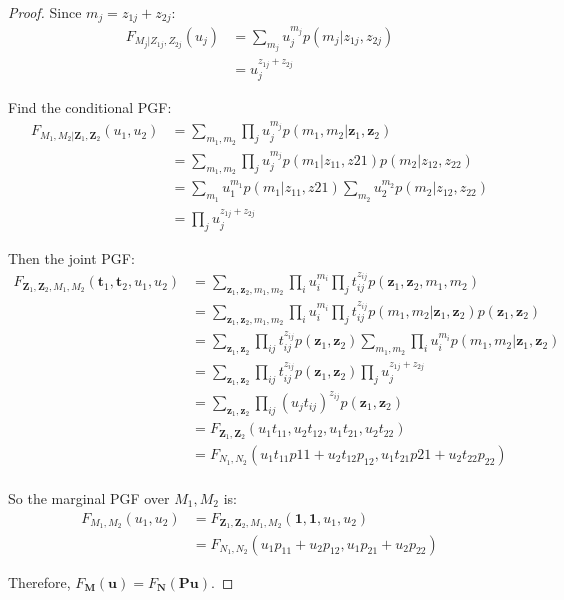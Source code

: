 \documentclass{article}
\begin{document}
\begin{proof}
Since $m_j = z_{1j} + z_{2j}$:
\begin{align*}
F_{M_j|Z_{1j}, Z_{2j}}(u_j) &= \sum_{m_j} u_j^{m_j} p(m_j|z_{1j}, z_{2j}) \\
&= u_j^{z_{1j} + z_{2j}}
\end{align*}

Find the conditional PGF:
\begin{align*}
F_{M_1, M_2 | \mathbf{Z}_1, \mathbf{Z}_2}(u_1, u_2)
&= \sum_{m_1, m_2} \prod_{j} u_{j}^{m_{j}} p(m_1, m_2|\mathbf{z}_1, \mathbf{z}_2) \\
&= \sum_{m_1, m_2} \prod_{j} u_{j}^{m_{j}} p(m_1|z_{11}, z{21}) p(m_2|z_{12}, z_{22}) \\
&= \sum_{m_1} u_1^{m_1} p(m_1|z_{11}, z{21}) \sum_{m_2} u_2^{m_2} p(m_2|z_{12}, z_{22}) \\
&= \prod_j u_j^{z_{1j} + z_{2j}}
\end{align*}

Then the joint PGF:
\begin{align*}
F_{\mathbf{Z}_1, \mathbf{Z}_2, M_1, M_2}(\mathbf{t}_1, \mathbf{t}_2, u_1, u_2)
&= \sum_{\mathbf{z}_1, \mathbf{z}_2, m_1, m_2} \prod_i u_i^{m_i} \prod_j t_{ij}^{z_{ij}} p(\mathbf{z}_1, \mathbf{z}_2, m_1, m_2) \\
&= \sum_{\mathbf{z}_1, \mathbf{z}_2, m_1, m_2} \prod_i u_i^{m_i} \prod_j t_{ij}^{z_{ij}} p(m_1, m_2|\mathbf{z}_1, \mathbf{z}_2) p(\mathbf{z}_1, \mathbf{z}_2) \\
&= \sum_{\mathbf{z}_1, \mathbf{z}_2} \prod_{ij} t_{ij}^{z_{ij}} p(\mathbf{z}_1, \mathbf{z}_2) \sum_{m_1, m_2} \prod_i u_i^{m_i} p(m_1, m_2|\mathbf{z}_1, \mathbf{z}_2) \\
&= \sum_{\mathbf{z}_1, \mathbf{z}_2} \prod_{ij} t_{ij}^{z_{ij}} p(\mathbf{z}_1, \mathbf{z}_2) \prod_j u_j^{z_{1j} + z_{2j}} \\
&= \sum_{\mathbf{z}_1, \mathbf{z}_2} \prod_{ij} (u_j t_{ij})^{z_{ij}} p(\mathbf{z}_1, \mathbf{z}_2) \\
&= F_{\mathbf{Z}_1, \mathbf{Z}_2}(u_1 t_{11}, u_2 t_{12}, u_1 t_{21}, u_2 t_{22}) \\
&= F_{N_1, N_2}(u_1 t_{11} p{11} + u_2 t_{12} p_{12}, u_1 t_{21} p{21} + u_2 t_{22} p_{22}) \\
\end{align*}

So the marginal PGF over $M_1, M_2$ is:
\begin{align*}
F_{M_1, M_2}(u_1, u_2) &= F_{\mathbf{Z}_1, \mathbf{Z}_2, M_1, M_2}(\mathbf{1}, \mathbf{1}, u_1, u_2) \\
&= F_{N_1, N_2}(u_1 p_{11} + u_2 p_{12}, u_1 p_{21} + u_2 p_{22})
\end{align*}

Therefore, $F_{\mathbf{M}}(\mathbf{u}) = F_{\mathbf{N}}(\mathbf{Pu})$.

\end{proof}
\end{document}
